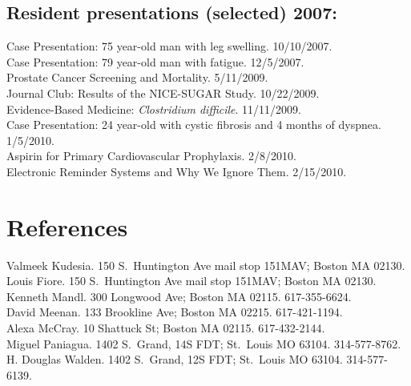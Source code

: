 \documentclass[12pt]{article}
\begin{document}
\subsection*{Resident presentations (selected) 2007:}
Case Presentation: 75 year-old man with leg swelling. 10/10/2007.\\
Case Presentation: 79 year-old man with fatigue. 12/5/2007.\\
Prostate Cancer Screening and Mortality. 5/11/2009.\\
Journal Club: Results of the NICE-SUGAR Study. 10/22/2009.\\
Evidence-Based Medicine: \emph{Clostridium difficile}. 11/11/2009.\\
Case Presentation: 24 year-old with cystic fibrosis and 4 months of
dyspnea. 1/5/2010.\\
Aspirin for Primary Cardiovascular Prophylaxis. 2/8/2010.\\
Electronic Reminder Systems and Why We Ignore Them. 2/15/2010.

\section*{References}
Valmeek Kudesia. 150 S.\ Huntington Ave mail stop 151MAV; Boston MA
02130.\\
Louis Fiore. 150 S.\ Huntington Ave mail stop 151MAV; Boston MA
02130.\\
Kenneth Mandl. 300 Longwood Ave; Boston MA 02115. 617-355-6624.\\
David Meenan. 133 Brookline Ave; Boston MA 02215. 617-421-1194.\\
Alexa McCray. 10 Shattuck St; Boston MA 02115. 617-432-2144.\\
Miguel Paniagua. 1402 S.\ Grand, 14S FDT; St.\ Louis MO 63104.
314-577-8762.\\
H. Douglas Walden. 1402 S.\ Grand, 12S FDT; St.\ Louis MO 63104.
314-577-6139.\\
\end{document}
